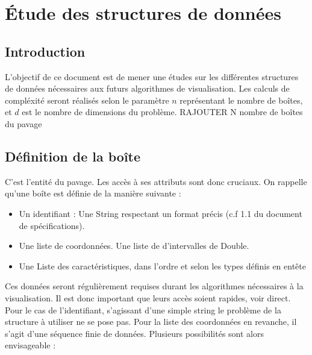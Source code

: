 \chapter{Étude des structures de données}








\section{Introduction}
L'objectif de ce document est de mener une études sur les différentes structures de données nécessaires aux futurs algorithmes de visualisation. Les calculs de compléxité seront réalisés selon le paramètre $n$  représentant le nombre de boîtes, et $d$ est le nombre de dimensions du problème. RAJOUTER N nombre de boîtes du pavage


\section{Définition de la boîte}
C'est l'entité du pavage. Les accès à ses attributs sont donc cruciaux. On rappelle qu'une boîte est définie de la manière suivante : 
\begin{itemize}
 \item 
Un identifiant : Une String respectant un format précis (c.f 1.1 du document de spécifications).
\item
Une liste de coordonnées. Une liste de d'intervalles de Double.
\item
Une Liste des caractéristiques, dans l'ordre et selon les types définis en entête
\end{itemize}

Ces données seront régulièrement requises durant les algorithmes nécessaires à la visualisation. Il est donc important que leurs accès soient rapides, voir direct. Pour le cas de l'identifiant, s'agissant d'une simple string le problème de la structure à utiliser ne se pose pas. Pour la liste des coordonnées en revanche, il s'agit d'une séquence finie de données. Plusieurs possibilités sont alors envisageable : 

